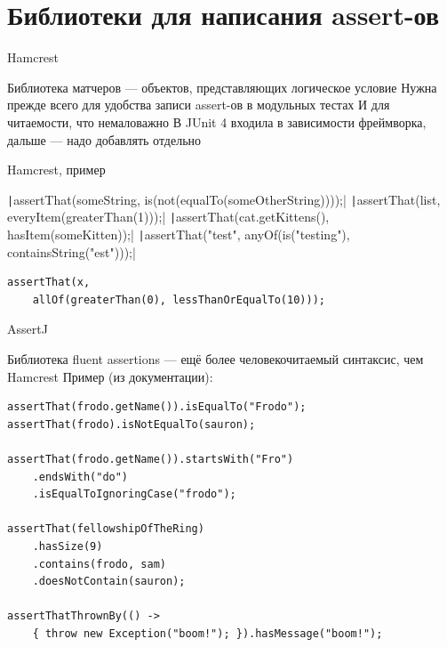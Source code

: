 \documentclass{../../slides-style}
\begin{document}
    \section{Библиотеки для написания assert-ов}

    \begin{frame}{Hamcrest}
        \begin{outline}
            \1 Библиотека матчеров --- объектов, представляющих логическое условие
            \1 Нужна прежде всего для удобства записи assert-ов в модульных тестах
                \2 И для читаемости, что немаловажно
            \1 В JUnit 4 входила в зависимости фреймворка, дальше --- надо добавлять отдельно
        \end{outline}
    \end{frame}

    \begin{frame}[fragile]{Hamcrest, пример}
        \begin{outline}
            \1 \texttt|assertThat(someString, is(not(equalTo(someOtherString))));|
            \1 \texttt|assertThat(list, everyItem(greaterThan(1)));|
            \1 \texttt|assertThat(cat.getKittens(), hasItem(someKitten));|
            \1 \texttt|assertThat("test", anyOf(is("testing"), containsString("est")));|
            \1 
                \begin{verbatim}
assertThat(x, 
    allOf(greaterThan(0), lessThanOrEqualTo(10)));
                \end{verbatim}
        \end{outline}
    \end{frame}

    \begin{frame}[fragile]{AssertJ}
        \begin{outline}
            \1 Библиотека fluent assertions --- ещё более человекочитаемый синтаксис, чем Hamcrest
            \1 Пример (из документации):
                \begin{footnotesize}
                    \begin{verbatim}
assertThat(frodo.getName()).isEqualTo("Frodo");
assertThat(frodo).isNotEqualTo(sauron);

assertThat(frodo.getName()).startsWith("Fro")
    .endsWith("do")
    .isEqualToIgnoringCase("frodo");

assertThat(fellowshipOfTheRing)
    .hasSize(9)
    .contains(frodo, sam)
    .doesNotContain(sauron);

assertThatThrownBy(() -> 
    { throw new Exception("boom!"); }).hasMessage("boom!");
                    \end{verbatim}
                \end{footnotesize}
        \end{outline}
    \end{frame}
\end{document}

